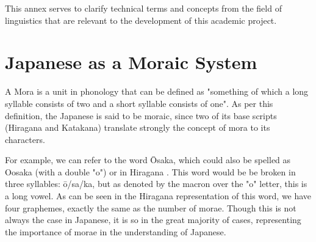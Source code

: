 This annex serves to clarify technical terms and concepts from the field of linguistics that are relevant to the development of this academic project.

\section{Japanese as a Moraic System}\label{mora}
A Mora is a unit in phonology that can be defined as "something of which a long syllable consists of two and a short syllable consists of one"\cite{mccawley1968}. As per this definition, the Japanese is said to be moraic, since two of its base scripts (Hiragana and Katakana) translate strongly the concept of mora to its characters. 

For example, we can refer to the word \={O}saka, which could also be spelled as Oosaka (with a double "o") or in Hiragana . This word would be be broken in three syllables: \={o}/sa/ka, but as denoted by the macron over the "o" letter, this is a long vowel. As can be seen in the Hiragana representation of this word, we have four graphemes, exactly the same as the number of morae. Though this is not always the case in Japanese, it is so in the great majority of cases, representing the importance of morae in the understanding of Japanese.
